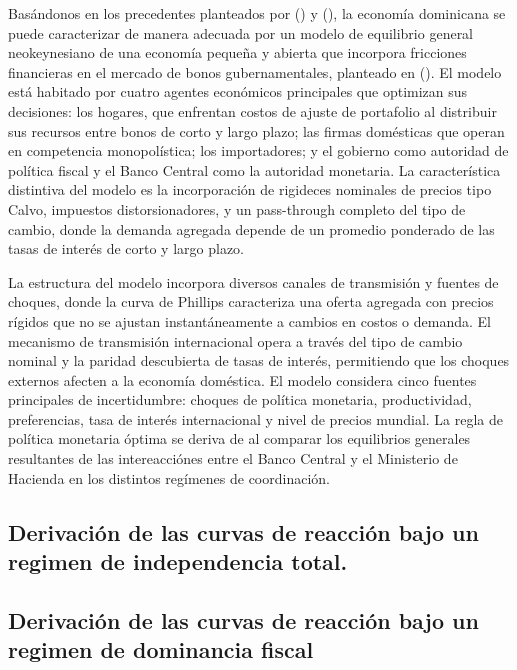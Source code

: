 \documentclass[
  man,
  longtable,
  nolmodern,
  notxfonts,
  notimes,
  colorlinks=true,linkcolor=blue,citecolor=blue,urlcolor=blue]{apa7}
\begin{document}
Basándonos en los precedentes planteados por
() y
(), la economía
dominicana se puede caracterizar de manera adecuada por un modelo de
equilibrio general neokeynesiano de una economía pequeña y abierta que
incorpora fricciones financieras en el mercado de bonos gubernamentales,
planteado en (). El modelo
está habitado por cuatro agentes económicos principales que optimizan
sus decisiones: los hogares, que enfrentan costos de ajuste de
portafolio al distribuir sus recursos entre bonos de corto y largo
plazo; las firmas domésticas que operan en competencia monopolística;
los importadores; y el gobierno como autoridad de política fiscal y el
Banco Central como la autoridad monetaria. La característica distintiva
del modelo es la incorporación de rigideces nominales de precios tipo
Calvo, impuestos distorsionadores, y un pass-through completo del tipo
de cambio, donde la demanda agregada depende de un promedio ponderado de
las tasas de interés de corto y largo plazo.

La estructura del modelo incorpora diversos canales de transmisión y
fuentes de choques, donde la curva de Phillips caracteriza una oferta
agregada con precios rígidos que no se ajustan instantáneamente a
cambios en costos o demanda. El mecanismo de transmisión internacional
opera a través del tipo de cambio nominal y la paridad descubierta de
tasas de interés, permitiendo que los choques externos afecten a la
economía doméstica. El modelo considera cinco fuentes principales de
incertidumbre: choques de política monetaria, productividad,
preferencias, tasa de interés internacional y nivel de precios mundial.
La regla de política monetaria óptima se deriva de al comparar los
equilibrios generales resultantes de las intereacciónes entre el Banco
Central y el Ministerio de Hacienda en los distintos regímenes de
coordinación.

\subsection{Derivación de las curvas de reacción bajo un regimen de
independencia
total.}\label{derivaciuxf3n-de-las-curvas-de-reacciuxf3n-bajo-un-regimen-de-independencia-total.}

\subsection{Derivación de las curvas de reacción bajo un regimen de
dominancia
fiscal}\label{derivaciuxf3n-de-las-curvas-de-reacciuxf3n-bajo-un-regimen-de-dominancia-fiscal}
\end{document}
